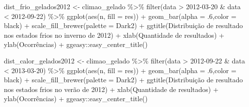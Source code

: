 \documentclass[
]{article}
\newenvironment{Shaded}{\begin{snugshade}}{\end{snugshade}}
\newcommand{\AttributeTok}[1]{\textcolor[rgb]{0.77,0.63,0.00}{#1}}
\newcommand{\DecValTok}[1]{\textcolor[rgb]{0.00,0.00,0.81}{#1}}
\newcommand{\FunctionTok}[1]{\textcolor[rgb]{0.00,0.00,0.00}{#1}}
\newcommand{\NormalTok}[1]{#1}
\newcommand{\OtherTok}[1]{\textcolor[rgb]{0.56,0.35,0.01}{#1}}
\newcommand{\SpecialCharTok}[1]{\textcolor[rgb]{0.00,0.00,0.00}{#1}}
\newcommand{\StringTok}[1]{\textcolor[rgb]{0.31,0.60,0.02}{#1}}
\begin{document}
\begin{Shaded}
\begin{Highlighting}[]
\NormalTok{dist\_frio\_gelados2012 }\OtherTok{\textless{}{-}}\NormalTok{ climao\_gelado }\SpecialCharTok{\%\textgreater{}\%} 
  \FunctionTok{filter}\NormalTok{(data }\SpecialCharTok{\textgreater{}} \StringTok{\textquotesingle{}2012{-}03{-}20\textquotesingle{}} \SpecialCharTok{\&}\NormalTok{ data }\SpecialCharTok{\textless{}} \StringTok{\textquotesingle{}2012{-}09{-}22\textquotesingle{}}\NormalTok{) }\SpecialCharTok{\%\textgreater{}\%}
  \FunctionTok{ggplot}\NormalTok{(}\FunctionTok{aes}\NormalTok{(n, }\AttributeTok{fill =}\NormalTok{ res)) }\SpecialCharTok{+} 
  \FunctionTok{geom\_bar}\NormalTok{(}\AttributeTok{alpha =}\NormalTok{ .}\DecValTok{6}\NormalTok{,}\AttributeTok{color =} \StringTok{\textquotesingle{}black\textquotesingle{}}\NormalTok{) }\SpecialCharTok{+} 
  \FunctionTok{scale\_fill\_brewer}\NormalTok{(}\AttributeTok{palette =} \StringTok{\textquotesingle{}Dark2\textquotesingle{}}\NormalTok{) }\SpecialCharTok{+}
  \FunctionTok{ggtitle}\NormalTok{(}\StringTok{\textquotesingle{}Distribuição de resultado nos estados frios no inverno de 2012\textquotesingle{}}\NormalTok{) }\SpecialCharTok{+}
  \FunctionTok{xlab}\NormalTok{(}\StringTok{\textquotesingle{}Quantidade de resultados\textquotesingle{}}\NormalTok{) }\SpecialCharTok{+} \FunctionTok{ylab}\NormalTok{(}\StringTok{\textquotesingle{}Ocorrências\textquotesingle{}}\NormalTok{) }\SpecialCharTok{+}
\NormalTok{  ggeasy}\SpecialCharTok{::}\FunctionTok{easy\_center\_title}\NormalTok{()}

\NormalTok{dist\_calor\_gelados2012 }\OtherTok{\textless{}{-}}\NormalTok{ climao\_gelado }\SpecialCharTok{\%\textgreater{}\%} 
  \FunctionTok{filter}\NormalTok{(data }\SpecialCharTok{\textgreater{}} \StringTok{\textquotesingle{}2012{-}09{-}22\textquotesingle{}} \SpecialCharTok{\&}\NormalTok{ data }\SpecialCharTok{\textless{}} \StringTok{\textquotesingle{}2013{-}03{-}20\textquotesingle{}}\NormalTok{) }\SpecialCharTok{\%\textgreater{}\%}
  \FunctionTok{ggplot}\NormalTok{(}\FunctionTok{aes}\NormalTok{(n, }\AttributeTok{fill =}\NormalTok{ res)) }\SpecialCharTok{+} 
  \FunctionTok{geom\_bar}\NormalTok{(}\AttributeTok{alpha =}\NormalTok{ .}\DecValTok{6}\NormalTok{,}\AttributeTok{color =} \StringTok{\textquotesingle{}black\textquotesingle{}}\NormalTok{) }\SpecialCharTok{+} 
  \FunctionTok{scale\_fill\_brewer}\NormalTok{(}\AttributeTok{palette =} \StringTok{\textquotesingle{}Dark2\textquotesingle{}}\NormalTok{) }\SpecialCharTok{+}
  \FunctionTok{ggtitle}\NormalTok{(}\StringTok{\textquotesingle{}Distribuição de resultado nos estados frios no verão de 2012\textquotesingle{}}\NormalTok{) }\SpecialCharTok{+}
  \FunctionTok{xlab}\NormalTok{(}\StringTok{\textquotesingle{}Quantidade de resultados\textquotesingle{}}\NormalTok{) }\SpecialCharTok{+} \FunctionTok{ylab}\NormalTok{(}\StringTok{\textquotesingle{}Ocorrências\textquotesingle{}}\NormalTok{) }\SpecialCharTok{+}
\NormalTok{  ggeasy}\SpecialCharTok{::}\FunctionTok{easy\_center\_title}\NormalTok{()}



\end{Highlighting}
\end{Shaded}
\end{document}
